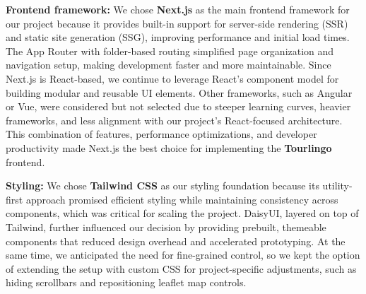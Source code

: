 \begin{table}[H]
\centering
\caption{Frontend Framework Comparison}
\end{table}

\textbf{Frontend framework:} We chose \textbf{Next.js} as the main frontend framework for our project because it provides built-in support for server-side rendering (SSR) and static site generation (SSG), improving performance and initial load times. The App Router with folder-based routing simplified page organization and navigation setup, making development faster and more maintainable. Since Next.js is React-based, we continue to leverage React’s component model for building modular and reusable UI elements. Other frameworks, such as Angular or Vue, were considered but not selected due to steeper learning curves, heavier frameworks, and less alignment with our project’s React-focused architecture. This combination of features, performance optimizations, and developer productivity made Next.js the best choice for implementing the \textbf{Tourlingo} frontend.\cite{nextjs, angular-official, vue-official}

\vspace{2em}

\textbf{Styling:}
We chose \textbf{Tailwind CSS} as our styling foundation because its utility-first approach promised efficient styling while maintaining consistency across components, which was critical for scaling the project. DaisyUI, layered on top of Tailwind, further influenced our decision by providing prebuilt, themeable components that reduced design overhead and accelerated prototyping. At the same time, we anticipated the need for fine-grained control, so we kept the option of extending the setup with custom CSS for project-specific adjustments, such as hiding scrollbars and repositioning leaflet map controls.\cite{tailwindcss, daisyui, css-official}

